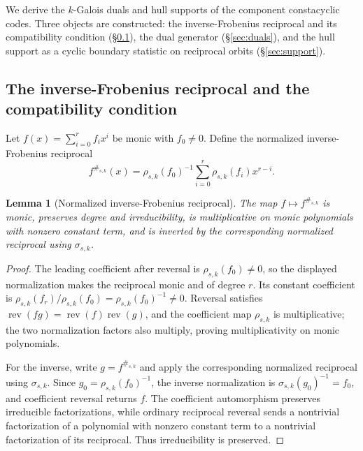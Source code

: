 \documentclass[10pt,a4paper]{article}
\numberwithin{equation}{section}
\theoremstyle{plain}
\newtheorem{lemma}[theorem]{Lemma}
\theoremstyle{definition}
\theoremstyle{remark}
\begin{document}
We derive the $k$-Galois duals and hull supports of the component constacyclic
codes. Three objects are constructed: the inverse-Frobenius reciprocal and its
compatibility condition (\S\ref{sec:reciprocal}), the dual generator
(\S\ref{sec:duals}), and the hull support as a cyclic boundary statistic on
reciprocal orbits (\S\ref{sec:support}).

\subsection{The inverse-Frobenius reciprocal and the compatibility condition}\label{sec:reciprocal}

Let $f(x)=\sum_{i=0}^{r}f_i x^i$ be monic with $f_0\neq 0$. Define the normalized
inverse-Frobenius reciprocal
\begin{equation}\label{eq:reciprocal}
f^{\#_{s,k}}(x)
 =\rho_{s,k}(f_0)^{-1}
   \sum_{i=0}^{r}\rho_{s,k}(f_i)x^{r-i}.
\end{equation}

\begin{lemma}[Normalized inverse-Frobenius reciprocal]\label{lem:reciprocal}
The map $f\mapsto f^{\#_{s,k}}$ is monic, preserves degree and irreducibility, is
multiplicative on monic polynomials with nonzero constant term, and is inverted
by the corresponding normalized reciprocal using $\sigma_{s,k}$.
\end{lemma}

\begin{proof}
The leading coefficient after reversal is $\rho_{s,k}(f_0)\ne0$, so the displayed
normalization makes the reciprocal monic and of degree $r$. Its constant
coefficient is $\rho_{s,k}(f_r)/\rho_{s,k}(f_0)=\rho_{s,k}(f_0)^{-1}\ne0$.
Reversal satisfies $\operatorname{rev}(fg)=\operatorname{rev}(f)\operatorname{rev}(g)$,
and the coefficient map $\rho_{s,k}$ is multiplicative; the two normalization
factors also multiply, proving multiplicativity on monic polynomials.

For the inverse, write $g=f^{\#_{s,k}}$ and apply the corresponding normalized
reciprocal using $\sigma_{s,k}$. Since $g_0=\rho_{s,k}(f_0)^{-1}$, the inverse
normalization is $\sigma_{s,k}(g_0)^{-1}=f_0$, and coefficient reversal returns
$f$. The coefficient automorphism preserves irreducible factorizations, while
ordinary reciprocal reversal sends a nontrivial factorization of a polynomial
with nonzero constant term to a nontrivial factorization of its reciprocal. Thus
irreducibility is preserved.
\end{proof}
\end{document}
